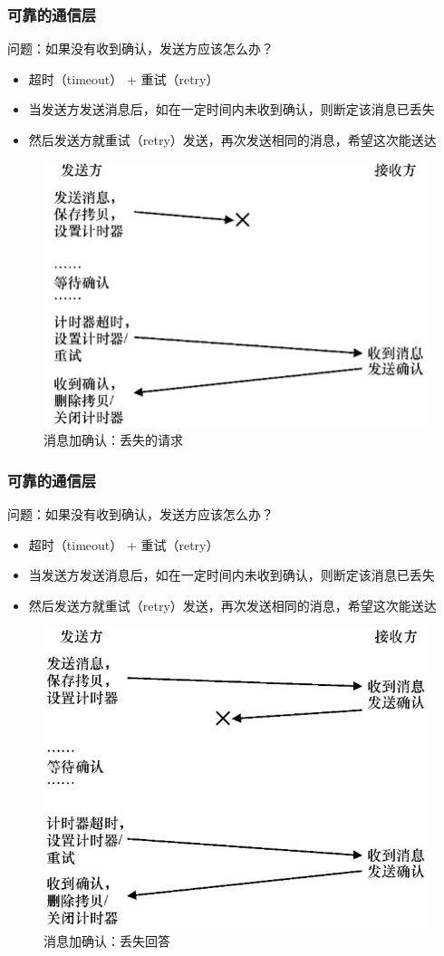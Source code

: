 \begin{frame}[fragile]
    \frametitle{可靠的通信层}
    问题：如果没有收到确认，发送方应该怎么办？\pause
    \begin{itemize}
        \item 超时（timeout） + 重试（retry）
        \item 当发送方发送消息后，如在一定时间内未收到确认，则断定该消息已丢失
        \item 然后发送方就重试（retry）发送，再次发送相同的消息，希望这次能送达
    \end{itemize}

    \begin{figure}
        \includegraphics[width=0.4\linewidth]{figs/timeout.png}
          \caption{消息加确认：丢失的请求}
    \end{figure}
\end{frame}


\begin{frame}[fragile]
    \frametitle{可靠的通信层}
    问题：如果没有收到确认，发送方应该怎么办？\pause
    \begin{itemize}
        \item 超时（timeout） + 重试（retry）
        \item 当发送方发送消息后，如在一定时间内未收到确认，则断定该消息已丢失
        \item 然后发送方就重试（retry）发送，再次发送相同的消息，希望这次能送达
    \end{itemize}
    
    \begin{figure}
        \includegraphics[width=0.35\linewidth]{figs/timeout-answer.png}
        \caption{消息加确认：丢失回答}
    \end{figure}
\end{frame}

